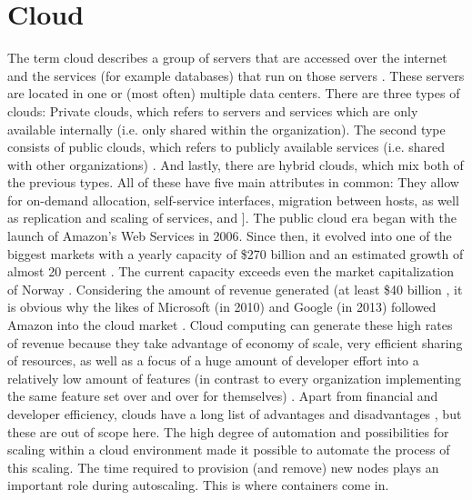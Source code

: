 \section{Cloud}
The term cloud describes a group of servers that are accessed over the internet and the services (for example databases) that run on those servers \cite{cloudflare_what_is_cloud}. These servers are located in one or (most often) multiple data centers. There are three types of clouds: Private clouds, which refers to servers and services which are only available internally (i.e. only shared within the organization). The second type consists of public clouds, which refers to publicly available services (i.e. shared with other organizations) \cite{cloudflare_what_is_private_cloud}. And lastly, there are hybrid clouds, which mix both of the previous types. All of these have five main attributes in common: They allow for on-demand allocation, self-service interfaces, migration between hosts, as well as replication and scaling of services, %
and \cite{microsoft_what_is_private_cloud}].
\newline
The public cloud era began with the launch of Amazon's Web Services in 2006. Since then, it evolved into one of the biggest markets with a yearly capacity of \$270 billion and an estimated growth of almost 20 percent \cite{gartner_forecast_cloud_spending}. The current capacity exceeds even the market capitalization of Norway \cite{indexmundi_ranking}. Considering the amount of revenue generated (at least \$40 billion \cite{indexmundi_ranking}, it is obvious why the likes of Microsoft (in 2010) and Google (in 2013) followed Amazon into the cloud market \cite{cbinsights_multi_cloud_strategies}.
\newline
Cloud computing can generate these high rates of revenue because they take advantage of economy of scale, very efficient sharing of resources, as well as a focus of a huge amount of developer effort into a relatively low amount of features (in contrast to every organization implementing the same feature set over and over for themselves) \cite{forbes_cloud_economy_scale}.
\newline
Apart from financial and developer efficiency, clouds have a long list of advantages and disadvantages \cite{dsl_for_iac}, but these are out of scope here.
\newline
The high degree of automation and possibilities for scaling within a cloud environment made it possible to automate the process of this scaling. The time required to provision (and remove) new nodes plays an important role during autoscaling. This is where containers come in.

